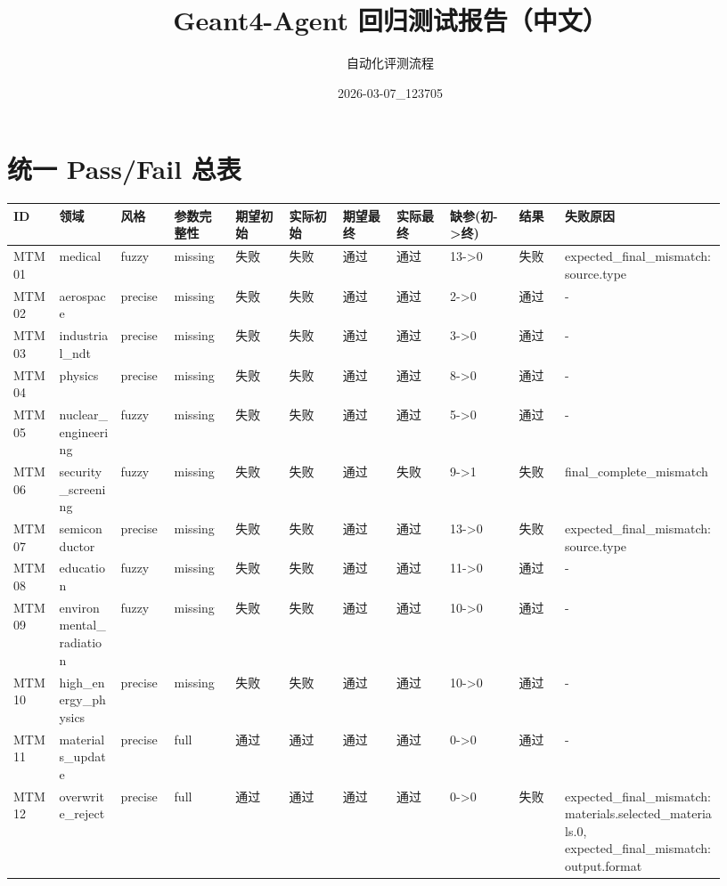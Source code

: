 \documentclass[11pt]{ctexart}
\title{Geant4-Agent 回归测试报告（中文）}
\author{自动化评测流程}
\date{2026-03-07\_123705}
\begin{document}
\maketitle
\section{统一 Pass/Fail 总表}
\begin{longtable}{p{0.06\linewidth}p{0.08\linewidth}p{0.07\linewidth}p{0.08\linewidth}p{0.07\linewidth}p{0.07\linewidth}p{0.07\linewidth}p{0.07\linewidth}p{0.09\linewidth}p{0.06\linewidth}p{0.21\linewidth}}
\toprule
ID & 领域 & 风格 & 参数完整性 & 期望初始 & 实际初始 & 期望最终 & 实际最终 & 缺参(初->终) & 结果 & 失败原因 \\
\midrule
MTM01 & medical & fuzzy & missing & 失败 & 失败 & 通过 & 通过 & 13->0 & 失败 & expected\_final\_mismatch:source.type \\
MTM02 & aerospace & precise & missing & 失败 & 失败 & 通过 & 通过 & 2->0 & 通过 & - \\
MTM03 & industrial\_ndt & precise & missing & 失败 & 失败 & 通过 & 通过 & 3->0 & 通过 & - \\
MTM04 & physics & precise & missing & 失败 & 失败 & 通过 & 通过 & 8->0 & 通过 & - \\
MTM05 & nuclear\_engineering & fuzzy & missing & 失败 & 失败 & 通过 & 通过 & 5->0 & 通过 & - \\
MTM06 & security\_screening & fuzzy & missing & 失败 & 失败 & 通过 & 失败 & 9->1 & 失败 & final\_complete\_mismatch \\
MTM07 & semiconductor & precise & missing & 失败 & 失败 & 通过 & 通过 & 13->0 & 失败 & expected\_final\_mismatch:source.type \\
MTM08 & education & fuzzy & missing & 失败 & 失败 & 通过 & 通过 & 11->0 & 通过 & - \\
MTM09 & environmental\_radiation & fuzzy & missing & 失败 & 失败 & 通过 & 通过 & 10->0 & 通过 & - \\
MTM10 & high\_energy\_physics & precise & missing & 失败 & 失败 & 通过 & 通过 & 10->0 & 通过 & - \\
MTM11 & materials\_update & precise & full & 通过 & 通过 & 通过 & 通过 & 0->0 & 通过 & - \\
MTM12 & overwrite\_reject & precise & full & 通过 & 通过 & 通过 & 通过 & 0->0 & 失败 & expected\_final\_mismatch:materials.selected\_materials.0, expected\_final\_mismatch:output.format \\
\bottomrule
\end{longtable}
\end{document}
